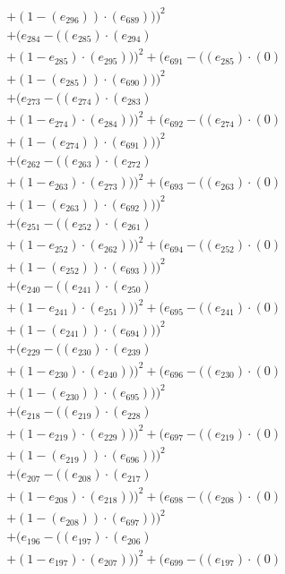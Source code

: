 \documentclass[10pt, a4paper]{article}
\begin{document}
\begin{align*}
& + (1 - (e_{296})) \cdot (e_{689})))^{2} \\
& + (e_{284} - ((e_{285})  \cdot  (e_{294}) \\
& + (1 - e_{285})  \cdot  (e_{295})))^{2} + (e_{691} - ((e_{285}) \cdot (0) \\
& + (1 - (e_{285})) \cdot (e_{690})))^{2} \\
& + (e_{273} - ((e_{274})  \cdot  (e_{283}) \\
& + (1 - e_{274})  \cdot  (e_{284})))^{2} + (e_{692} - ((e_{274}) \cdot (0) \\
& + (1 - (e_{274})) \cdot (e_{691})))^{2} \\
& + (e_{262} - ((e_{263})  \cdot  (e_{272}) \\
& + (1 - e_{263})  \cdot  (e_{273})))^{2} + (e_{693} - ((e_{263}) \cdot (0) \\
& + (1 - (e_{263})) \cdot (e_{692})))^{2} \\
& + (e_{251} - ((e_{252})  \cdot  (e_{261}) \\
& + (1 - e_{252})  \cdot  (e_{262})))^{2} + (e_{694} - ((e_{252}) \cdot (0) \\
& + (1 - (e_{252})) \cdot (e_{693})))^{2} \\
& + (e_{240} - ((e_{241})  \cdot  (e_{250}) \\
& + (1 - e_{241})  \cdot  (e_{251})))^{2} + (e_{695} - ((e_{241}) \cdot (0) \\
& + (1 - (e_{241})) \cdot (e_{694})))^{2} \\
& + (e_{229} - ((e_{230})  \cdot  (e_{239}) \\
& + (1 - e_{230})  \cdot  (e_{240})))^{2} + (e_{696} - ((e_{230}) \cdot (0) \\
& + (1 - (e_{230})) \cdot (e_{695})))^{2} \\
& + (e_{218} - ((e_{219})  \cdot  (e_{228}) \\
& + (1 - e_{219})  \cdot  (e_{229})))^{2} + (e_{697} - ((e_{219}) \cdot (0) \\
& + (1 - (e_{219})) \cdot (e_{696})))^{2} \\
& + (e_{207} - ((e_{208})  \cdot  (e_{217}) \\
& + (1 - e_{208})  \cdot  (e_{218})))^{2} + (e_{698} - ((e_{208}) \cdot (0) \\
& + (1 - (e_{208})) \cdot (e_{697})))^{2} \\
& + (e_{196} - ((e_{197})  \cdot  (e_{206}) \\
& + (1 - e_{197})  \cdot  (e_{207})))^{2} + (e_{699} - ((e_{197}) \cdot (0) \\

\end{align*}
\end{document}
